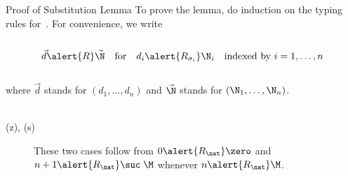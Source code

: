 \begin{frame}{Proof of Substitution Lemma}
  To prove the lemma, do induction on the typing rules for~\PCF{}. 
  For convenience, we write
  \\~\\
  \[
    \vec{d} \alert{\mathrel{R}} \vec{\N}
    \quad\text{for}\quad
    d_i \alert{\mathrel{R_{\sigma_i}}} \N_i
    \quad\text{indexed by~$i = 1, \dots, n$}
  \]
  ~\\
  where $\vec{d}$ stands for $(d_1, \dots, d_n)$
  and $\vec{\N}$ stands for $(\N_1, \dots, \N_n)$.
  \\~\\
  \begin{description}
    \item[(z), (s)] These two cases follow from
      $0\alert{\mathrel{R}_\nat}\zero$ and $n+1 \alert{\mathrel{R_\nat}}
      \suc\;\M$ whenever $n \alert{\mathrel{R_\nat}} \M$. 
  \end{description}
\end{frame}

